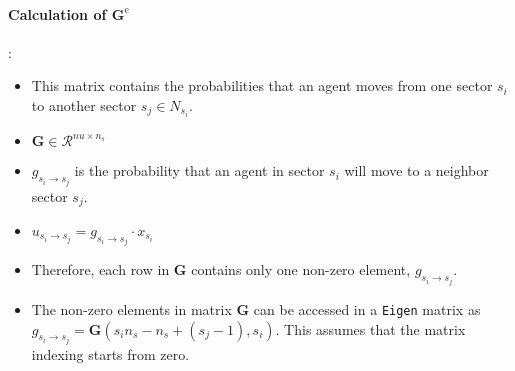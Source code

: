 \documentclass{article}
\begin{document}
\paragraph{Calculation of $\mathbf{G}^{\text{e}}$}: 
\begin{itemize}
\item This matrix contains the probabilities that an agent moves from one sector $s_i$ to another sector $s_j \in N_{s_i}$.
\item  $\mathbf{G} \in \mathcal{R}^{nu \times n_s}$
\item $g_{s_i \rightarrow s_j}$ is the probability that an agent in sector $s_i$ will move to a neighbor sector $s_j$.
\item $u_{s_i \rightarrow s_j} = g_{s_i \rightarrow s_j} \cdot x_{s_i}$
\item Therefore, each row in $\mathbf{G}$ contains only one non-zero element, $g_{s_i \rightarrow s_j}$.
\item The non-zero elements in matrix $\mathbf{G}$ can be accessed in a \texttt{Eigen} matrix as $g_{s_i \rightarrow s_j} = \mathbf{G}(s_i n_s - n_s + (s_j-1), s_i )$. This assumes that the matrix indexing starts from zero.
\end{itemize}


%
\end{document}
